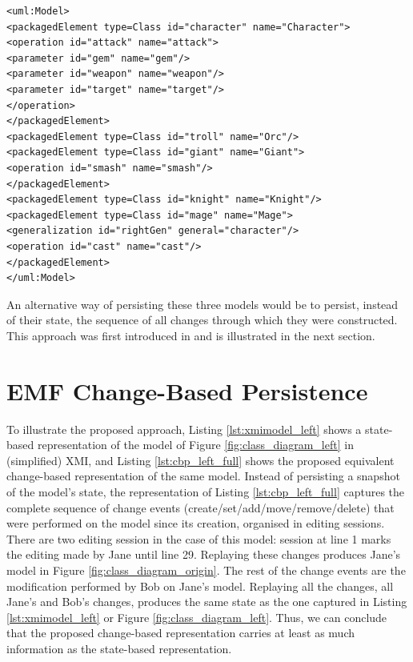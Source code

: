 \begin{lstlisting}[style=xmi,caption={Simplified XMI file of the right version of Figure \ref{fig:class_diagram_right}.},label=lst:xmimodel_right]
<uml:Model>
<packagedElement type=Class id="character" name="Character">
<operation id="attack" name="attack">
<parameter id="gem" name="gem"/>
<parameter id="weapon" name="weapon"/>
<parameter id="target" name="target"/>
</operation>
</packagedElement>
<packagedElement type=Class id="troll" name="Orc"/>
<packagedElement type=Class id="giant" name="Giant">
<operation id="smash" name="smash"/>
</packagedElement>
<packagedElement type=Class id="knight" name="Knight"/>
<packagedElement type=Class id="mage" name="Mage">
<generalization id="rightGen" general="character"/>
<operation id="cast" name="cast"/>
</packagedElement>
</uml:Model>
\end{lstlisting}

An alternative way of persisting these three models would be to persist, instead of their state, the sequence of all changes through which they were constructed. This approach was first introduced in \cite{DBLP:conf/models/YohannisKP17} and is illustrated in the next section.


\section{EMF Change-Based Persistence}
\label{sec:emf_change_based_persistence}

To illustrate the proposed approach, Listing \ref{lst:xmimodel_left} shows a state-based representation of the model of Figure \ref{fig:class_diagram_left} in (simplified) XMI, and Listing \ref{lst:cbp_left_full} shows the proposed equivalent change-based representation of the same model. Instead of persisting a snapshot of the model's state, the representation of Listing \ref{lst:cbp_left_full} captures the complete sequence of change events (create/set/add/move/remove/delete) that were performed on the model since its creation, organised in editing sessions. There are two editing session in the case of this model: session at line 1 marks the editing made by Jane until line 29. Replaying these changes produces Jane's model in Figure \ref{fig:class_diagram_origin}. The rest of the change events are the modification performed by Bob on Jane's model. Replaying all the changes, all Jane's and Bob's changes, produces the same state as the one captured in Listing \ref{lst:xmimodel_left} or Figure \ref{fig:class_diagram_left}. Thus, we can conclude that the proposed change-based representation carries at least as much information as the state-based representation. 

